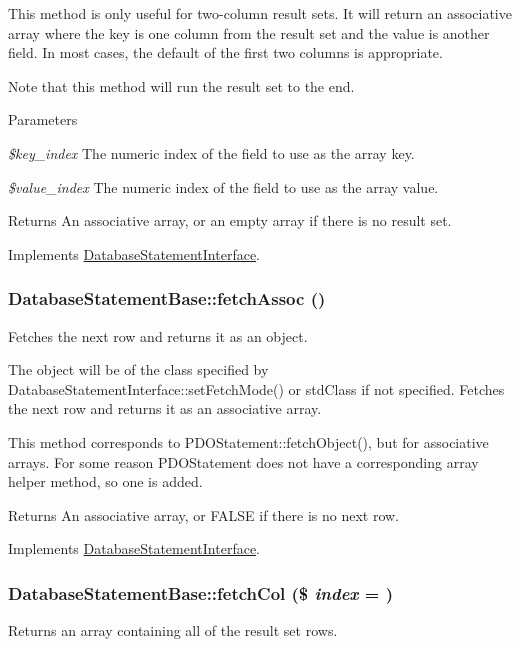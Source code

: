 This method is only useful for two-\/column result sets. It will return an associative array where the key is one column from the result set and the value is another field. In most cases, the default of the first two columns is appropriate.

Note that this method will run the result set to the end.


\begin{DoxyParams}{Parameters}
\item[{\em \$key\_\-index}]The numeric index of the field to use as the array key. \item[{\em \$value\_\-index}]The numeric index of the field to use as the array value.\end{DoxyParams}
\begin{DoxyReturn}{Returns}
An associative array, or an empty array if there is no result set. 
\end{DoxyReturn}


Implements \hyperlink{interfaceDatabaseStatementInterface_a9ffce739d0b144c36fc60b0a7e8a9824}{DatabaseStatementInterface}.\hypertarget{classDatabaseStatementBase_af1eb19aab88b13d6045bd6cce1b3c573}{
\subsubsection[{fetchAssoc}]{\setlength{\rightskip}{0pt plus 5cm}DatabaseStatementBase::fetchAssoc ()}}
\label{classDatabaseStatementBase_af1eb19aab88b13d6045bd6cce1b3c573}
Fetches the next row and returns it as an object.

The object will be of the class specified by DatabaseStatementInterface::setFetchMode() or stdClass if not specified. Fetches the next row and returns it as an associative array.

This method corresponds to PDOStatement::fetchObject(), but for associative arrays. For some reason PDOStatement does not have a corresponding array helper method, so one is added.

\begin{DoxyReturn}{Returns}
An associative array, or FALSE if there is no next row. 
\end{DoxyReturn}


Implements \hyperlink{interfaceDatabaseStatementInterface_a754f04359c97c0866f5d80e785a24299}{DatabaseStatementInterface}.\hypertarget{classDatabaseStatementBase_a0f1eb97063c61c3c0dc98b946595bc5b}{
\subsubsection[{fetchCol}]{\setlength{\rightskip}{0pt plus 5cm}DatabaseStatementBase::fetchCol (\$ {\em index} = {})}}
\label{classDatabaseStatementBase_a0f1eb97063c61c3c0dc98b946595bc5b}
Returns an array containing all of the result set rows.


